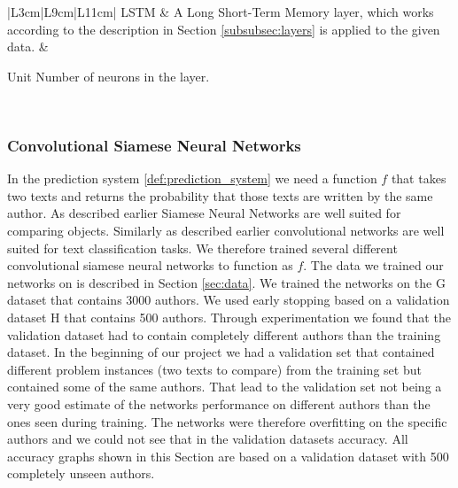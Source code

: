 \begin{landscape}
\begin{table}
\begin{tabular}{|L{3cm}|L{9cm}|L{11cm}|}
            LSTM                                                               &
            A Long Short-Term Memory layer, which works according to the
            description in Section \ref{subsubsec:layers} is applied to the
            given data.                                                        &
            \begin{minipage}[t]{\linewidth}
            \begin{compactdesc}
                \item[Unit] Number of neurons in the layer.
            \end{compactdesc}
            \end{minipage}                                                    \\
            \hline
        \end{tabular}
    \end{table}
\end{landscape}


\subsubsection{Convolutional Siamese Neural Networks}

In the prediction system \ref{def:prediction_system} we need a function $f$
that takes two texts and returns the probability that those texts are written
by the same author. As described earlier Siamese Neural Networks are well
suited for comparing objects. Similarly as described earlier convolutional
networks are well suited for text classification tasks. We therefore trained
several different convolutional siamese neural networks to function as $f$.
The data we trained our networks on is described in Section \ref{sec:data}. We
trained the networks on the G dataset that contains 3000 authors. We used early
stopping based on a validation dataset H that contains 500 authors. Through
experimentation we found that the validation dataset had to contain completely
different authors than the training dataset. In the beginning of our project we
had a validation set that contained different problem instances (two texts to
compare) from the training set but contained some of the same authors. That lead
to the validation set not being a very good estimate of the networks performance
on different authors than the ones seen during training. The networks were
therefore overfitting on the specific authors and we could not see that in the
validation datasets accuracy. All accuracy graphs shown in this Section are
based on a validation dataset with 500 completely unseen authors.


